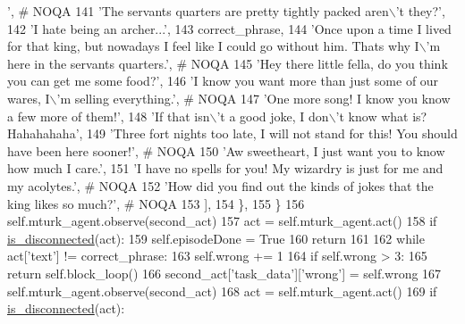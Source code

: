\begin{DoxyCode}
{      '},  \textcolor{comment}{# NOQA}
141                     \textcolor{stringliteral}{'The servants quarters are pretty tightly packed aren\(\backslash\)'t they?'},
142                     \textcolor{stringliteral}{'I hate being an archer...'},
143                     correct\_phrase,
144                     \textcolor{stringliteral}{'Once upon a time I lived for that king, but nowadays I feel like I could go without
       him. Thats why I\(\backslash\)'m here in the servants quarters.'},  \textcolor{comment}{# NOQA}
145                     \textcolor{stringliteral}{'Hey there little fella, do you think you can get me some food?'},
146                     \textcolor{stringliteral}{'I know you want more than just some of our wares, I\(\backslash\)'m selling everything.'},  \textcolor{comment}{# NOQA}
147                     \textcolor{stringliteral}{'One more song! I know you know a few more of them!'},
148                     \textcolor{stringliteral}{'If that isn\(\backslash\)'t a good joke, I don\(\backslash\)'t know what is? Hahahahaha'},
149                     \textcolor{stringliteral}{'Three fort nights too late, I will not stand for this! You should have been here
       sooner!'},  \textcolor{comment}{# NOQA}
150                     \textcolor{stringliteral}{'Aw sweetheart, I just want you to know how much I care.'},
151                     \textcolor{stringliteral}{'I have no spells for you! My wizardry is just for me and my acolytes.'},  \textcolor{comment}{# NOQA}
152                     \textcolor{stringliteral}{'How did you find out the kinds of jokes that the king likes so much?'},  \textcolor{comment}{# NOQA}
153                 ],
154             \},
155         \}
156         self.mturk\_agent.observe(second\_act)
157         act = self.mturk\_agent.act()
158         \textcolor{keywordflow}{if} \hyperlink{namespacelight__chats_1_1worlds_a43b0aff73307cda95a089763b77f40d3}{is\_disconnected}(act):
159             self.episodeDone = \textcolor{keyword}{True}
160             \textcolor{keywordflow}{return}
161 
162         \textcolor{keywordflow}{while} act[\textcolor{stringliteral}{'text'}] != correct\_phrase:
163             self.wrong += 1
164             \textcolor{keywordflow}{if} self.wrong > 3:
165                 \textcolor{keywordflow}{return} self.block\_loop()
166             second\_act[\textcolor{stringliteral}{'task\_data'}][\textcolor{stringliteral}{'wrong'}] = self.wrong
167             self.mturk\_agent.observe(second\_act)
168             act = self.mturk\_agent.act()
169             \textcolor{keywordflow}{if} \hyperlink{namespacelight__chats_1_1worlds_a43b0aff73307cda95a089763b77f40d3}{is\_disconnected}(act):

\end{DoxyCode}
